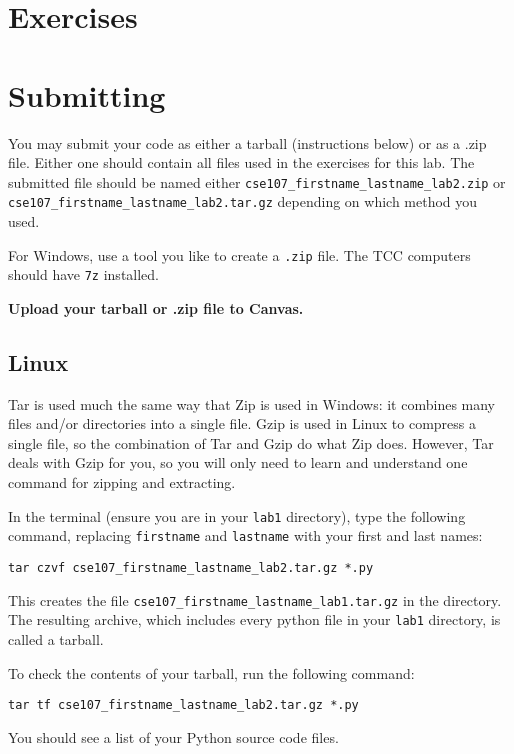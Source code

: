 \documentclass[12pt,hidelinks]{article}
\begin{document}
\pagebreak
\section{Exercises}

\pagebreak
\section{Submitting}

You may submit your code as either a tarball (instructions below) or as a .zip
file. Either one should contain all files used in the exercises for this lab.
The submitted file should be named either
\texttt{cse107\_firstname\_lastname\_lab2.zip} or
\texttt{cse107\_firstname\_lastname\_lab2.tar.gz} depending on which method you
used.

For Windows, use a tool you like to create a \texttt{.zip} file. The TCC computers should
have \texttt{7z} installed.

\begin{center}
  \textbf{Upload your tarball or .zip file to Canvas.}
\end{center}

\subsection{Linux}

Tar is used much the same way that Zip is used in Windows: it combines many files and/or directories into a single file. Gzip is used in Linux to compress a single file, so the combination of Tar and Gzip do what Zip does. However, Tar deals with Gzip for you, so you will only need to learn and understand one command for zipping and extracting.

In the terminal (ensure you are in your \texttt{lab1} directory), type the following command, replacing \texttt{firstname} and \texttt{lastname} with your first and last names:

\begin{lstlisting}[style=bash]
tar czvf cse107_firstname_lastname_lab2.tar.gz *.py
\end{lstlisting}

This creates the file \texttt{cse107\_firstname\_lastname\_lab1.tar.gz} in the directory. The resulting archive, which includes every python file in your \texttt{lab1} directory, is called a tarball. 

To check the contents of your tarball, run the following command:

\begin{lstlisting}[style=bash]
tar tf cse107_firstname_lastname_lab2.tar.gz *.py
\end{lstlisting}

You should see a list of your Python source code files.
\end{document}
